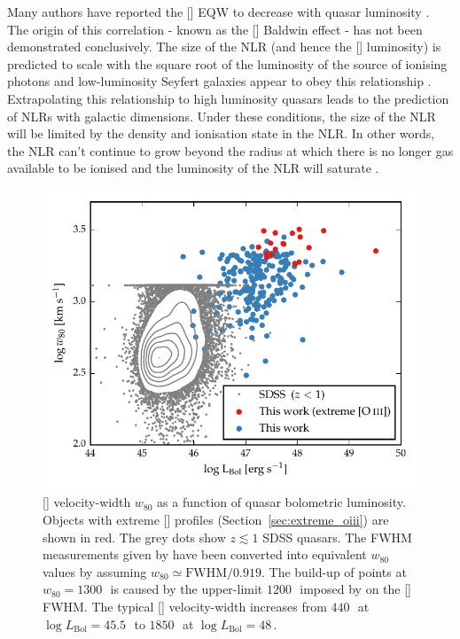 Many authors have reported the [] EQW to decrease with quasar luminosity \citep[e.g.][]{brotherton96,sulentic04,baskin05b,zhang11,stern12}.
The origin of this correlation - known as the [] Baldwin effect \citep[e.g.][]{baldwin77} - has not been demonstrated conclusively. 
The size of the NLR (and hence the [] luminosity) is predicted to scale with the square root of the luminosity of the source of ionising photons \citep[e.g.][]{netzer90} and low-luminosity Seyfert galaxies appear to obey this relationship \citep[e.g.][]{bennert02}. 
Extrapolating this relationship to high luminosity quasars leads to the prediction of NLRs with galactic dimensions.
Under these conditions, the size of the NLR will be limited by the density and ionisation state in the NLR. 
In other words, the NLR can't continue to grow beyond the radius at which there is no longer gas available to be ionised and the luminosity of the NLR will saturate \citep[e.g.][]{hainline13,hainline14}. 

\begin{figure}[t!]
    \centering
    \includegraphics[width=\columnwidth]{figures/chapter04/lum_w80.pdf} 
    \caption[{[] velocity-width $w_{80}$ as a function of quasar bolometric luminosity.}]{[] velocity-width $w_{80}$ as a function of quasar bolometric luminosity. Objects with extreme [] profiles (Section~\ref{sec:extreme_oiii}) are shown in red. The grey dots show $z\lesssim1$ SDSS quasars. The FWHM measurements given by \citet{shen11} have been converted into equivalent $w_{80}$ values by assuming $w_{80} \simeq \text{FWHM} / 0.919$. The build-up of points at $w_{80}=1300$\,\kms\, is caused by the upper-limit $1200$\,\kms\, imposed by \citet{shen11} on the [] FWHM. The typical [] velocity-width increases from $440$\,\kms\, at $\log L_{\text{Bol}}=45.5$\,\ergs\, to $1850$\,\kms\, at $\log L_{\text{Bol}}=48$\,\ergs.} 
    \label{fig:lum_w80}
\end{figure}

